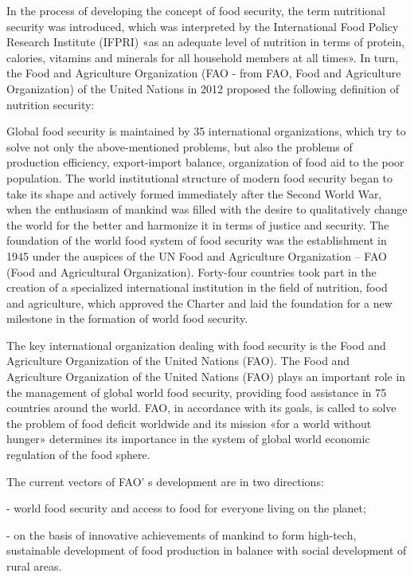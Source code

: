 \begin{multicols}{2}
In the process of developing the concept of food security, the term
nutritional security was introduced, which was interpreted by the
International Food Policy Research Institute (IFPRI) «as an adequate
level of nutrition in terms of protein, calories, vitamins and minerals
for all household members at all times». In turn, the Food and
Agriculture Organization (FAO - from FAO, Food and Agriculture
Organization) of the United Nations in 2012 proposed the following
definition of nutrition security:

Global food security is maintained by 35 international organizations,
which try to solve not only the above-mentioned problems, but also the
problems of production efficiency, export-import balance, organization
of food aid to the poor population. The world institutional structure of
modern food security began to take its shape and actively formed
immediately after the Second World War, when the enthusiasm of mankind
was filled with the desire to qualitatively change the world for the
better and harmonize it in terms of justice and security. The foundation
of the world food system of food security was the establishment in 1945
under the auspices of the UN Food and Agriculture Organization -- FAO
(Food and Agricultural Organization). Forty-four countries took part in
the creation of a specialized international institution in the field of
nutrition, food and agriculture, which approved the Charter and laid the
foundation for a new milestone in the formation of world food security.

The key international organization dealing with food security is the
Food and Agriculture Organization of the United Nations (FAO). The Food
and Agriculture Organization of the United Nations (FAO) plays an
important role in the management of global world food security,
providing food assistance in 75 countries around the world. FAO, in
accordance with its goals, is called to solve the problem of food
deficit worldwide and its mission «for a world without hunger»
determines its importance in the system of global world economic
regulation of the food sphere.

The current vectors of FAO' s development are in two
directions:

- world food security and access to food for everyone living on the
planet;

- on the basis of innovative achievements of mankind to form high-tech,
sustainable development of food production in balance with social
development of rural areas.


\end{multicols}
